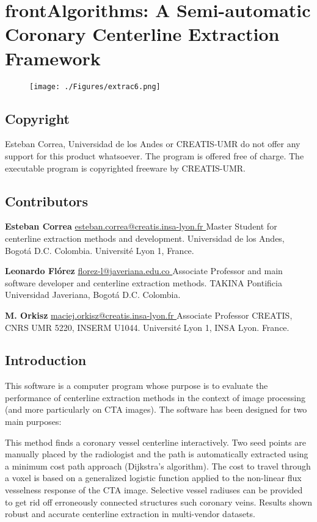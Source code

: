 
\chapter{frontAlgorithms: A Semi-automatic Coronary Centerline Extraction Framework} \label{AppendixA}

\begin{figure}[ht]
	\centering
		\texttt{[image: ./Figures/extrac6.png]}
	\label{fig:apa_cent1}
\end{figure}
\clearpage

\section{Copyright}
Esteban Correa, Universidad de los Andes or CREATIS-UMR do not offer any support for this product whatsoever. The program is offered free of charge. The executable program is copyrighted freeware by CREATIS-UMR.

\section{Contributors}

\textbf{Esteban Correa}
\href{mailto:esteban.correa@creatis.insa-lyon.fr }{esteban.correa@creatis.insa-lyon.fr }
Master Student for centerline extraction methods and development.
Universidad de los Andes, Bogot\'a D.C. Colombia.
Université Lyon 1, France.

\textbf{Leonardo Fl\'orez}
\href{mailto:florez-l@javeriana.edu.co }{florez-l@javeriana.edu.co }
Associate Professor and main software developer and centerline extraction methods.
TAKINA
Pontificia Universidad Javeriana, Bogot\'a D.C. Colombia.

\textbf{M. Orkisz}
\href{mailto:maciej.orkisz@creatis.insa-lyon.fr }{maciej.orkisz@creatis.insa-lyon.fr }
Associate Professor
CREATIS, CNRS UMR 5220, INSERM U1044.
Université Lyon 1, INSA Lyon. France.

\section{Introduction}
This software is a computer program whose purpose is to evaluate the performance of centerline extraction methods in the context of image processing (and more particularly on CTA images).
The software has been designed for two main purposes:

This method finds a coronary vessel centerline interactively. Two seed points are manually placed by the radiologist and the path is automatically extracted using a minimum cost path approach (Dijkstra’s algorithm). The cost to travel through a voxel is based on a generalized logistic function applied to the non-linear flux vesselness response \citep{Lesage2009a}  of the CTA image. Selective vessel radiuses can be provided to get rid off erroneously connected structures such coronary veins. Results shown robust and accurate centerline extraction in multi-vendor datasets.

